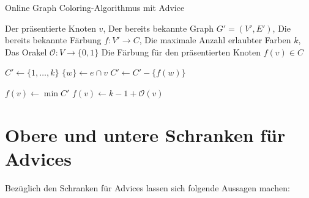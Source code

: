\documentclass[11pt,abstracton]{scrreprt} %
\theoremstyle{definition}
\begin{document}
\begin{algorithm}
\caption{Online Graph Coloring-Algorithmus mit Advice}
\label{algo.advice}
\begin{algorithmic}
\Require
	\State Der präsentierte Knoten $v$,
	\State Der bereits bekannte Graph $G' = (V', E')$,
	\State Die bereits bekannte Färbung $f : V' \rightarrow C$,
	\State Die maximale Anzahl erlaubter Farben $k$,
	\State Das Orakel $\mathcal{O} : V \rightarrow \{0,1\}$
\Ensure
	\State Die Färbung für den präsentierten Knoten $f(v) \in C$
\Statex

\State $C' \gets \{1, \dots, k\}$
	\State $\{w\} \gets e \cap v$
		\State $C' \gets C' - \{ f(w) \}$
	\EndIf
\EndFor
\EndFor

\Statex

	\State $ f(v) \gets \min C'$
\Else
	\State $ f(v) \gets k-1+\mathcal{O}(v)$
\EndIf

\end{algorithmic}
\end{algorithm}

\section{Obere und untere Schranken für Advices}

Bezüglich den Schranken für Advices lassen sich folgende Aussagen machen:
\end{document}
